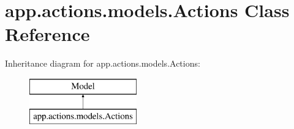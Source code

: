 \hypertarget{classapp_1_1actions_1_1models_1_1_actions}{}\section{app.\+actions.\+models.\+Actions Class Reference}
\label{classapp_1_1actions_1_1models_1_1_actions}
Inheritance diagram for app.\+actions.\+models.\+Actions\+:\begin{figure}[H]
\begin{center}
\leavevmode
\includegraphics[height=2.000000cm]{classapp_1_1actions_1_1models_1_1_actions}
\end{center}
\end{figure}

